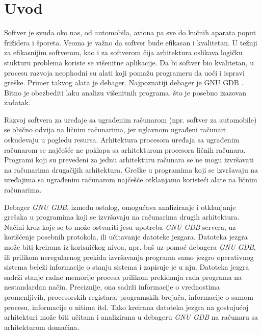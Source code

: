 \documentclass[12pt,oneside]{memoir}
\begin{document}
\frontmatter
\naslovna
\komisija
\apstrakt
\tableofcontents*

\mainmatter

\chapter{Uvod}

Softver je svuda oko nas, od automobila, aviona pa sve do kućnih aparata poput frižidera i šporeta. Veoma je važno da softver bude efikasan i kvalitetan. U težnji za efikasnijim softverom, kao i za softverom čija arhitektura oslikava logičku stukturu problema koriste se višenitne aplikacije. Da bi softver bio kvalitetan, u procesu razvoja neophodni su alati koji pomažu programeru da uoči i ispravi greške. Primer takvog alata je debager. Najpoznatiji debager je GNU GDB \cite{GDB}. Bitno je obezbediti laku analizu višenitnih programa, što je posebno izazovan zadatak.

Razvoj softvera za uređaje sa ugrađenim računarom (npr. softver za automobile) se obično odvija na ličnim računarima, jer uglavnom ugrađeni računari oskudevaju u pogledu resursa. Arhitektura procesora uređaja sa ugrađenim računarom se najčešće ne poklapa sa  arhitekturom procesora ličnih računara. Programi koji su prevedeni za jednu arhitekturu računara se ne mogu izvršavati na računarima drugačijih arhitektura. Greške u programima koji se izvršavaju na uređajima sa ugrađenim računarom najčešće otklanjamo koristeći alate na ličnim računarima.

Debager \emph{GNU GDB}, između ostalog, omogućava analiziranje i otklanjanje grešaka u programima koji se izvršavaju na računarima drugih arhitektura. Načini kroz koje se to može ostvariti jesu upotreba \emph{GNU GDB} servera, uz korišćenje posebnih protokola, ili učitavanje datoteke jezgara.
Datoteka jezgra može biti kreirana iz korisničkog nivoa, npr. baš uz pomoć debagera \emph{GNU GDB}, ili prilikom neregularnog prekida izvršavanja programa samo jezgro operativnog sistema beleži informacije o stanju sistema i zapisuje je u nju. Datoteka jezgra sadrži stanje radne memorije procesa prilikom prekidanja rada programa na nestandardan način. Preciznije, ona sadrži informacije o vrednostima promenljivih, procesorskih registara, programskih brojača, informacije o samom procesu, informacije o nitima itd. Tako kreirana datoteka jezgra na gostujućoj arhitekturi može biti učitana i analizirana u debageru \emph{GNU GDB} na računaru sa arhitekturom domaćina.
\end{document}
